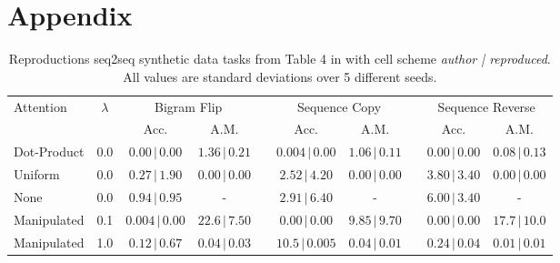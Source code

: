 \appendix
\section{Appendix}
\begin{table}[h!]
    \caption{Reproductions seq2seq synthetic data tasks from Table 4 in \cite{pruthi-etal-2020-learning}with cell scheme \textit{author | reproduced}. All values are standard deviations over 5 different seeds.}
    \label{tab:seq-to-seq synth results stdv}
    \centering
    \begin{tabular}{lccccccccc}
    \toprule
Attention & $\lambda$ & \multicolumn{2}{c}{Bigram Flip} &  & \multicolumn{2}{c}{Sequence Copy} &  & \multicolumn{2}{c}{Sequence Reverse} \\ \cline{3-4} \cline{6-7} \cline{9-10}
                           &                        & \multicolumn{1}{c}{Acc.}           & \multicolumn{1}{c}{A.M.}           &  & \multicolumn{1}{c}{Acc.}            & \multicolumn{1}{c}{A.M.}            &  & \multicolumn{1}{c}{Acc.}              & \multicolumn{1}{c}{A.M.}                    \\
      \midrule
      Dot-Product   & 0.0 & $0.00\pmb{\,|\,}0.00$ & $1.36\pmb{\,|\,}0.21$ & & $0.004\pmb{\,|\,}0.00$ & $1.06\pmb{\,|\,}0.11$ & & $0.00\pmb{\,|\,}0.00$ & $0.08\pmb{\,|\,}0.13$
      \\
      \midrule
      Uniform   & 0.0 & $0.27\pmb{\,|\,}1.90$ & $0.00\pmb{\,|\,}0.00$ & & $2.52\pmb{\,|\,}4.20$ & $0.00\pmb{\,|\,}0.00$ & & $3.80\pmb{\,|\,}3.40$ & $0.00\pmb{\,|\,}0.00$
      \\
      None   & 0.0 & $0.94\pmb{\,|\,}0.95$ & - & & $2.91\pmb{\,|\,}6.40$ & - & & $6.00\pmb{\,|\,}3.40$ & -
      \\
      \midrule
      Manipulated   & 0.1 & $0.004\pmb{\,|\,}0.00$ & $22.6\pmb{\,|\,}7.50$ & & $0.00\pmb{\,|\,}0.00$ & $9.85\pmb{\,|\,}9.70$ & & $0.00\pmb{\,|\,}0.00$ & $17.7\pmb{\,|\,}10.0$
      \\
      Manipulated   & 1.0 & $0.12\pmb{\,|\,}0.67$ & $0.04\pmb{\,|\,}0.03$ & & $10.5\pmb{\,|\,}0.005$ & $0.04\pmb{\,|\,}0.01$ & & $0.24\pmb{\,|\,}0.04$ & $0.01\pmb{\,|\,}0.01$
    \\
    \bottomrule
    \end{tabular}
\end{table}

